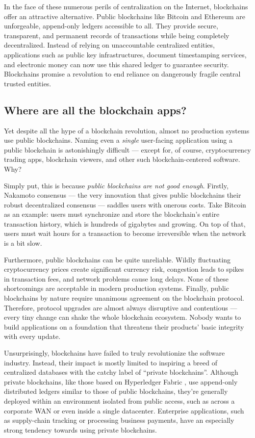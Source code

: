 \documentclass[headinclude,12pt]{scrbook}
\begin{document}
In the face of these numerous perils of centralization on the Internet, blockchains offer an attractive alternative. Public blockchains like Bitcoin \cite{nakamoto2008bitcoin} and Ethereum \cite{wood2014ethereum} are unforgeable, append-only ledgers accessible to all. They provide secure, transparent, and permanent records of transactions while being completely decentralized. Instead of relying on unaccountable centralized entities, applications such as public key infrastructures, document timestamping services, and electronic money can now use this shared ledger to guarantee security. Blockchains promise a revolution to end reliance on dangerously fragile central trusted entities.


\subsection{Where are all the blockchain apps?}

Yet despite all the hype of a blockchain revolution, almost no production systems use public blockchains. Naming even a \emph{single} user-facing application using a public blockchain is astonishingly difficult --- except for, of course, cryptocurrency trading apps, blockchain viewers, and other such blockchain-centered software. Why?

Simply put, this is because \emph{public blockchains are not good enough}. Firstly, Nakamoto consensus --- the very innovation that gives public blockchains their robust decentralized consensus --- saddles users with onerous costs. Take Bitcoin as an example: users must synchronize and store the blockchain's entire transaction history, which is hundreds of gigabytes and growing. On top of that, users must wait hours for a transaction to become irreversible when the network is a bit slow.

Furthermore, public blockchains can be quite unreliable. Wildly fluctuating cryptocurrency prices create significant currency risk, congestion leads to spikes in transaction fees, and network problems cause long delays. None of these shortcomings are acceptable in modern production systems. Finally, public blockchains by nature require unanimous agreement on the blockchain protocol. Therefore, protocol upgrades are almost always disruptive and contentious --- every tiny change can shake the whole blockchain ecosystem. Nobody wants to build applications on a foundation that threatens their products' basic integrity with every update.

Unsurprisingly, blockchains have failed to truly revolutionize the software industry. Instead, their impact is mostly limited to inspiring a breed of centralized databases with the catchy label of ``private blockchains''. Although private blockchains, like those based on Hyperledger Fabric \cite{cachin2016architecture}, use append-only distributed ledgers similar to those of public blockchains, they're generally deployed within an environment isolated from public access, such as across a corporate WAN or even inside a single datacenter. Enterprise applications, such as supply-chain tracking or processing business payments, have an especially strong tendency towards using private blockchains.
\end{document}
